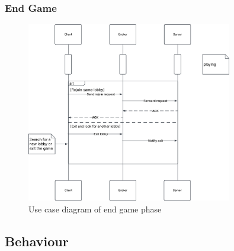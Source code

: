 \documentclass{scrartcl}
\begin{document}
\subsubsection{End Game}\label{end-game}
\begin{figure}[H]
    \centering
    \includegraphics[width=0.8\textwidth]{figures/sequenceEndGame.png}
    \caption{Use case diagram of end game phase}
    \label{fig:end-game}
\end{figure}


\subsection{Behaviour}\label{behaviour}
\end{document}
